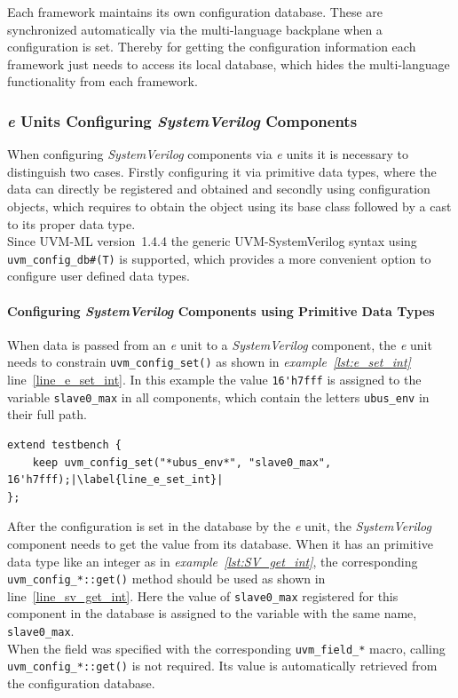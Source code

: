 Each framework maintains its own configuration database. These are synchronized automatically via the multi-language
backplane when a configuration is set. Thereby for getting the configuration information each framework just needs to
access its local database, which hides the multi-language functionality from each framework.

\subsubsection{\textit{e} Units Configuring \emph{SystemVerilog} Components}\label{e_config_sv}

When configuring \emph{SystemVerilog} components via \textit{e} units it is necessary to distinguish two cases. Firstly
configuring it via primitive data types, where the data can directly be registered and obtained and secondly using
configuration objects, which requires to obtain the object using its base class followed by a cast to its proper data
type.\\
Since UVM-ML version~1.4.4 the generic UVM-SystemVerilog syntax using \lstinline$uvm_config_db#(T)$ is supported, which
provides a more convenient option to configure user defined data types. 

\paragraph{Configuring \emph{SystemVerilog} Components using Primitive Data Types}\label{config_sv_primitive}

When data is passed from an \textit{e} unit to a \emph{SystemVerilog} component,
the \textit{e} unit needs to constrain \lstinline$uvm_config_set()$ as shown in \emph{example~\ref{lst:e_set_int}}
line~\ref{line_e_set_int}. In this example the value \lstinline$16'h7fff$ is assigned to the variable
\lstinline$slave0_max$ in all components, which contain the letters \lstinline$ubus_env$ in their full path.

\lstset{language=e, numbers = left, escapechar=|, breaklines=true}
\begin{lstlisting}[frame=htrbl, caption={\textit{e}: register an integer in configuration database},
label={lst:e_set_int}]
extend testbench {
    keep uvm_config_set("*ubus_env*", "slave0_max", 16'h7fff);|\label{line_e_set_int}|
};
\end{lstlisting}

After the configuration is set in the database by the \textit{e} unit, the \emph{SystemVerilog} component needs to get
the value from its database. When it has an primitive data type like an integer as in \emph{example~\ref{lst:SV_get_int}},
the corresponding \lstinline$uvm_config_*::get()$ method should be used as shown in line~\ref{line_sv_get_int}. Here the
value of \lstinline$slave0_max$ registered for this component in the database is assigned to the variable with the same
name, \lstinline$slave0_max$.\\
When the field was specified with the corresponding \lstinline$uvm_field_*$ macro, calling
\lstinline$uvm_config_*::get()$ is not required. Its value is automatically retrieved from the configuration database.

